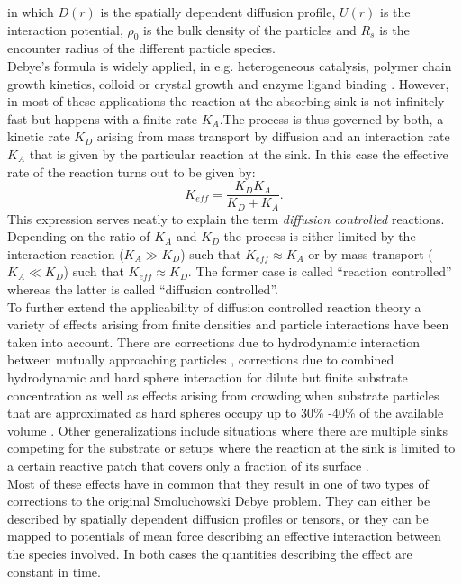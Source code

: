 in which $D(r)$ is the spatially dependent diffusion profile, $U(r)$ is the interaction potential, $\rho_0$ is the bulk density of the particles and $R_s$ is the encounter radius of the different particle species. \\
Debye's formula is widely applied, in e.g. heterogeneous catalysis, polymer chain growth kinetics, colloid or crystal growth and enzyme ligand binding \cite{hawker2001new, hansen2002robust, aizenberg1999control, achilias1992development, wisanrakkit1990glass, berg1985diffusion, kuo1974studies, richter1974, alberty1958, Wu2012a}. However, in most of these applications the reaction at the absorbing sink is not infinitely fast but happens with a finite rate $K_A$.The process is thus governed by both, a kinetic rate $K_D$ arising from mass transport by diffusion and an interaction rate $K_A$ that is given by the particular reaction at the sink. In this case the effective rate of the reaction turns out to be given by:
\begin{equation}
    K_{eff} = \frac{K_D K_A}{K_D + K_A}.
    \label{KeffIntro}
\end{equation}
This expression serves neatly to explain the term \emph{diffusion controlled} reactions. Depending on the ratio of $K_A$ and $K_D$ the process is either limited by the interaction reaction ($K_A \gg K_D$) such that $K_{eff} \approx K_A$ or by mass transport ($K_A \ll K_D$) such that $K_{eff} \approx K_D$. The former case is called ``reaction controlled'' whereas the latter is called ``diffusion controlled''. \\

To further extend the applicability of diffusion controlled reaction theory a variety of effects arising from finite densities and particle interactions have been taken into account. There are corrections due to hydrodynamic interaction between mutually approaching particles \cite{Friedman1966, Wolyes1976}, corrections due to combined hydrodynamic and hard sphere interaction for dilute but finite substrate concentration \cite{Dzubiella2005} as well as effects arising from crowding when substrate particles that are approximated as hard spheres occupy up to 30\% -40\% of the available volume \cite{Dorsaz2010}. Other generalizations include situations where there are multiple sinks competing for the substrate \cite{Reck1968a, Reck1968b} or setups where the reaction at the sink is limited to a certain reactive patch that covers only a fraction of its surface \cite{schmitz1972role, schurr1976, shoup1981diffusion, shoup1982role}. \\
Most of these effects have in common that they result in one of two types of corrections to the original Smoluchowski Debye problem. They can either be described by spatially dependent diffusion profiles or tensors, or they can be mapped to potentials of mean force describing an effective interaction between the species involved. In both cases the quantities describing the effect are constant in time.
\newpage
